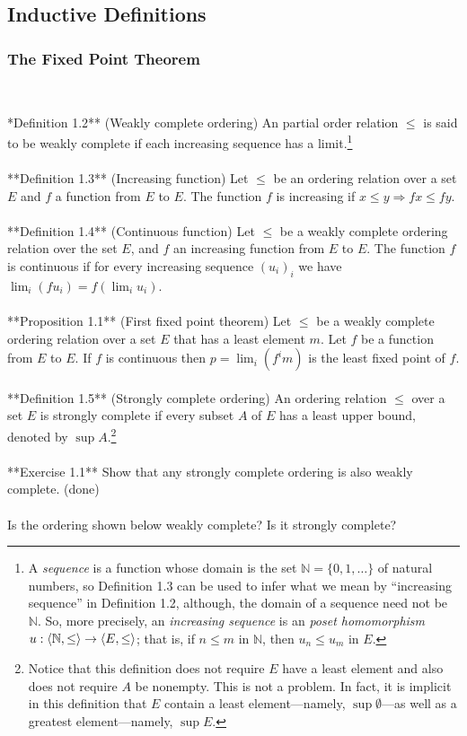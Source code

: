 \subsection{Inductive Definitions}

\subsubsection{The Fixed Point Theorem}\

\noindent **Definition 1.2** (Weakly complete ordering) An partial order relation
$\leq$ is said to be weakly complete if each increasing sequence has a 
limit.\footnote{A \emph{sequence} is a function whose domain is
the set $\mathbb{N} = \{0,1,\dots\}$ of natural numbers, so Definition 1.3
can be used to infer what we mean by ``increasing sequence'' in Definition 1.2, although,
the domain of a sequence need not be $\mathbb{N}$. So, more precisely, 
an \emph{increasing sequence} is an \emph{poset homomorphism} $u: \langle\mathbb{N}, \leq\rangle \to
\langle E, \leq \rangle$; that is, if $n\leq m$ in $\mathbb{N}$, then $u_n \leq u_m$ in $E$.}\\
\\
**Definition 1.3** (Increasing function) Let $\leq$ be an ordering relation over
a set $E$ and $f$ a function from $E$ to $E$. The function $f$ is increasing if
$x \leq y \Rightarrow f x \leq fy$. \\
\\
**Definition 1.4** (Continuous function) Let $\leq$ be a weakly complete
ordering relation over the set $E$, and $f$ an increasing function from $E$ to
$E$. The function $f$ is continuous if for every increasing sequence $(u_i)_i$
we have  $\lim_i (f u_i ) = f (\lim_i u_i )$.\\
\\
**Proposition 1.1** (First fixed point theorem) Let $\leq$ be a weakly complete ordering
relation over a set $E$ that has a least element $m$. Let $f$ be a function from 
$E$ to $E$. If $f$ is continuous then $p = \lim_i (f^i m)$ is the least fixed
point of $f$. \\
\\
**Definition 1.5** (Strongly complete ordering) An ordering relation $\leq$ over a set $E$
is strongly complete if every subset $A$ of
$E$ has a least upper bound, denoted by $\sup A$.\footnote{Notice that this definition
  does not require $E$ have a least element and also does not require
  $A$ be nonempty.  This is not a problem. In fact, it is implicit in this definition that
  $E$ contain a least element---namely, $\sup \emptyset$---as well as a greatest 
  element---namely, $\sup E$.}\\
\\
**Exercise 1.1** Show that any strongly complete ordering is also weakly complete.  
(done)\\
\\
Is the ordering shown below weakly complete? Is it strongly complete?  


